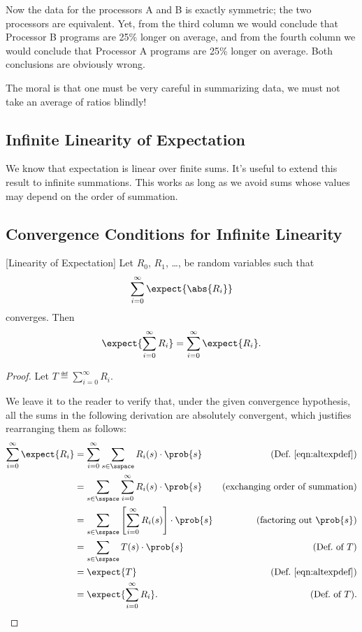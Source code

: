 Now the data for the processors A and B is exactly symmetric; the two
processors are equivalent.  Yet, from the third column we would
conclude that Processor B programs are 25\% longer on average, and
from the fourth column we would conclude that Processor A programs are
25\% longer on average.  Both conclusions are obviously wrong.

The moral is that one must be very careful in summarizing data, we must
not take an average of ratios blindly!

\begin{editingnotes}
\section{Infinite Linearity of Expectation}

We know that expectation is linear over finite sums.  It's useful to
extend this result to infinite summations.  This works as long as we avoid
sums whose values may depend on the order of summation.

\subsection{Convergence Conditions for Infinite Linearity}

\begin{theorem}\label{linexp} [Linearity of Expectation]
Let $R_0$, $R_1$, \dots, be random variables such that
\[
\sum_{i = 0}^\infty \expect{\abs{R_i}}
\]
converges.  Then
\[
   \expect{\sum_{i = 0}^\infty R_i} = \sum_{i = 0}^\infty \expect{R_i}.
\]
\end{theorem}

\begin{proof}
Let $T \eqdef \sum_{i = 0}^\infty R_i$.

We leave it to the reader to verify that, under the given convergence
hypothesis, all the sums in the following derivation are absolutely
convergent, which justifies rearranging them as follows:
\begin{align*}
\sum_{i=0}^\infty \expect{R_i}
    &= \sum_{i=0}^\infty \sum_{s \in \sspace} R_i(s) \cdot \prob{s}
            & \text{(Def.~\ref{eqn:altexpdef})}\\
    &= \sum_{s \in \sspace} \sum_{i=0}^\infty R_i(s) \cdot \prob{s}
           & \text{(exchanging order of summation)}\\
    &= \sum_{s \in \sspace} \left[ \sum_{i=0}^\infty R_i(s) \right] \cdot \prob{s}
                & \text{(factoring out $\prob{s}$)}\\
    &= \sum_{s \in \sspace} T(s) \cdot \prob{s} & \text{(Def.\ of $T$)}\\
    &= \expect{T} & \text{(Def.~\ref{eqn:altexpdef})}\\
    &= \expect{\sum_{i = 0}^\infty R_i}. &  \text{(Def.\ of $T$)}.
\end{align*}
\end{proof}


\end{editingnotes}
